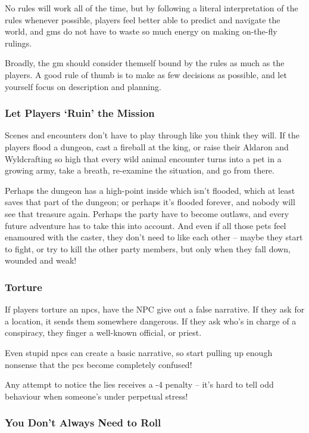 \begin{multicols}{2}
No rules will work all of the time, but by following a literal interpretation of the rules whenever possible, players feel better able to predict and navigate the world, and \glspl{gm} do not have to waste so much energy on making on-the-fly rulings.

Broadly, the \gls{gm} should consider themself bound by the rules as much as the players.
A good rule of thumb is to make as few decisions as possible, and let yourself focus on description and planning.

\subsubsection{Let Players `Ruin' the Mission}

Scenes and encounters don't have to play through like you think they will.
If the players flood a dungeon, cast a fireball at the king, or raise their Aldaron and Wyldcrafting so high that every wild animal encounter turns into a pet in a growing army, take a breath, re-examine the situation, and go from there.

Perhaps the dungeon has a high-point inside which isn't flooded, which at least saves that part of the dungeon; or perhaps it's flooded forever, and nobody will see that treasure again.
Perhaps the party have to become outlaws, and every future adventure has to take this into account.
And even if all those pets feel enamoured with the caster, they don't need to like each other -- maybe they start to fight, or try to kill the other party members, but only when they fall down, wounded and weak!

\subsubsection{Torture}

If players torture an \glspl{npc}, have the NPC give out a false narrative.
If they ask for a location, it sends them somewhere dangerous.
If they ask who's in charge of a conspiracy, they finger a well-known official, or priest.

Even stupid \glspl{npc} can create a basic narrative, so start pulling up enough nonsense that the \glspl{pc} become completely confused!

Any attempt to notice the lies receives a -4 penalty -- it's hard to tell odd behaviour when someone's under perpetual stress!

\subsubsection{You Don't Always Need to Roll}


\end{multicols}

